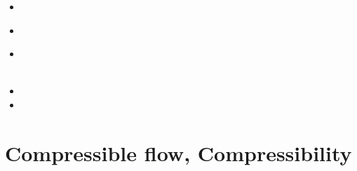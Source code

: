 \begin{small}
\begin{itemize}
\item[\twothousand] 
\item[\twothousandfour] 
 \\
\item[\twothousandsix] 
 \\
 \\
\item[\twothousandseven] 
\item[\twothousandeleven] 
\end{itemize}
\end{small}









\section{Compressible flow, Compressibility}


